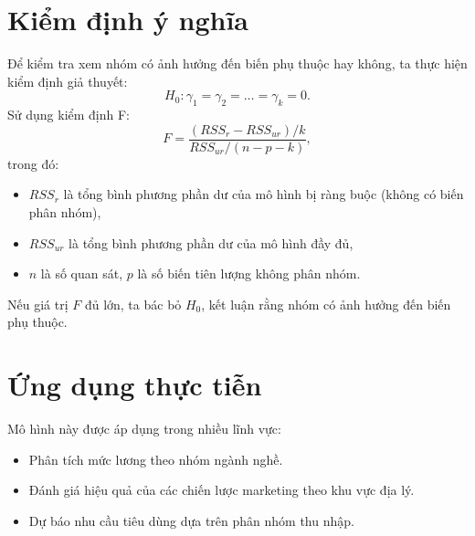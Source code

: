 \section{Kiểm định ý nghĩa}
Để kiểm tra xem nhóm có ảnh hưởng đến biến phụ thuộc hay không, ta thực hiện kiểm định giả thuyết:
\begin{equation}
H_0: \gamma_1 = \gamma_2 = \dots = \gamma_k = 0.
\end{equation}
Sử dụng kiểm định F:
\begin{equation}
F = \frac{(RSS_{r} - RSS_{ur}) / k}{RSS_{ur} / (n - p - k)},
\end{equation}
trong đó:
\begin{itemize}
\item $RSS_r$ là tổng bình phương phần dư của mô hình bị ràng buộc (không có biến phân nhóm),
\item $RSS_{ur}$ là tổng bình phương phần dư của mô hình đầy đủ,
\item $n$ là số quan sát, $p$ là số biến tiên lượng không phân nhóm.
\end{itemize}

Nếu giá trị $F$ đủ lớn, ta bác bỏ $H_0$, kết luận rằng nhóm có ảnh hưởng đến biến phụ thuộc.

\section{Ứng dụng thực tiễn}
Mô hình này được áp dụng trong nhiều lĩnh vực:
\begin{itemize}
\item Phân tích mức lương theo nhóm ngành nghề.
\item Đánh giá hiệu quả của các chiến lược marketing theo khu vực địa lý.
\item Dự báo nhu cầu tiêu dùng dựa trên phân nhóm thu nhập.
\end{itemize}